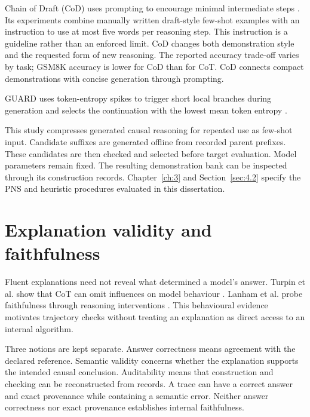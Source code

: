 Chain of Draft (CoD) uses prompting to encourage minimal intermediate steps \cite{xu2025chaindraftthinkingfaster}. Its experiments combine manually written draft-style few-shot examples with an instruction to use at most five words per reasoning step. This instruction is a guideline rather than an enforced limit. CoD changes both demonstration style and the requested form of new reasoning. The reported accuracy trade-off varies by task; GSM8K accuracy is lower for CoD than for CoT. CoD connects compact demonstrations with concise generation through prompting.

GUARD uses token-entropy spikes to trigger short local branches during generation and selects the continuation with the lowest mean token entropy \cite{zhu2026failure}.

This study compresses generated causal reasoning for repeated use as few-shot input. Candidate suffixes are generated offline from recorded parent prefixes. These candidates are then checked and selected before target evaluation. Model parameters remain fixed. The resulting demonstration bank can be inspected through its construction records. Chapter~\ref{ch:3} and Section~\ref{sec:4.2} specify the PNS and heuristic procedures evaluated in this dissertation. 

\section{Explanation validity and faithfulness}\label{sec:2.4}

Fluent explanations need not reveal what determined a model's answer. Turpin et al. show that CoT can omit influences on model behaviour \cite{NEURIPS2023_ed3fea90}. Lanham et al. probe faithfulness through reasoning interventions \cite{Lanham_2023_Faithfulness}. This behavioural evidence motivates trajectory checks without treating an explanation as direct access to an internal algorithm.

Three notions are kept separate. Answer correctness means agreement with the declared reference. Semantic validity concerns whether the explanation supports the intended causal conclusion. Auditability means that construction and checking can be reconstructed from records. A trace can have a correct answer and exact provenance while containing a semantic error. Neither answer correctness nor exact provenance establishes internal faithfulness.

